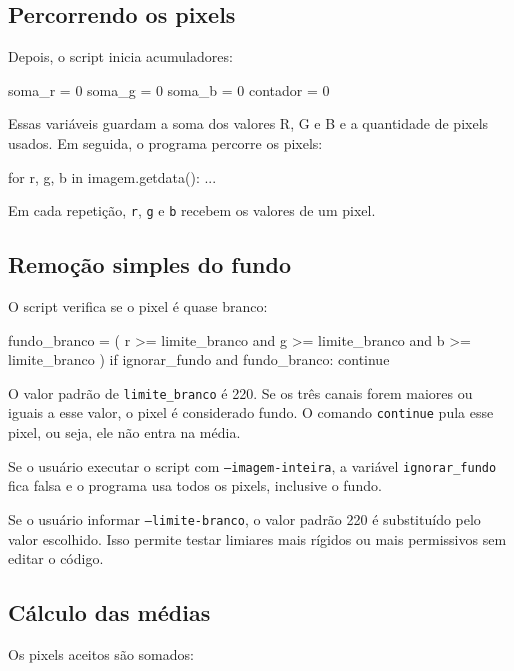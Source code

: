\documentclass[12pt]{article}
\begin{document}
\subsection{Percorrendo os pixels}

Depois, o script inicia acumuladores:

\begin{codebox}
soma_r = 0
soma_g = 0
soma_b = 0
contador = 0
\end{codebox}

Essas variáveis guardam a soma dos valores R, G e B e a quantidade de pixels usados. Em seguida, o programa percorre os pixels:

\begin{codebox}
for r, g, b in imagem.getdata():
    ...
\end{codebox}

Em cada repetição, \texttt{r}, \texttt{g} e \texttt{b} recebem os valores de um pixel.

\subsection{Remoção simples do fundo}

O script verifica se o pixel é quase branco:

\begin{codebox}
fundo_branco = (
    r >= limite_branco and
    g >= limite_branco and
    b >= limite_branco
)
if ignorar_fundo and fundo_branco:
    continue
\end{codebox}

O valor padrão de \texttt{limite\_branco} é 220. Se os três canais forem maiores ou iguais a esse valor, o pixel é considerado fundo. O comando \texttt{continue} pula esse pixel, ou seja, ele não entra na média.

Se o usuário executar o script com \texttt{--imagem-inteira}, a variável \texttt{ignorar\_fundo} fica falsa e o programa usa todos os pixels, inclusive o fundo.

Se o usuário informar \texttt{--limite-branco}, o valor padrão 220 é substituído pelo valor escolhido. Isso permite testar limiares mais rígidos ou mais permissivos sem editar o código.

\subsection{Cálculo das médias}

Os pixels aceitos são somados:
\end{document}

